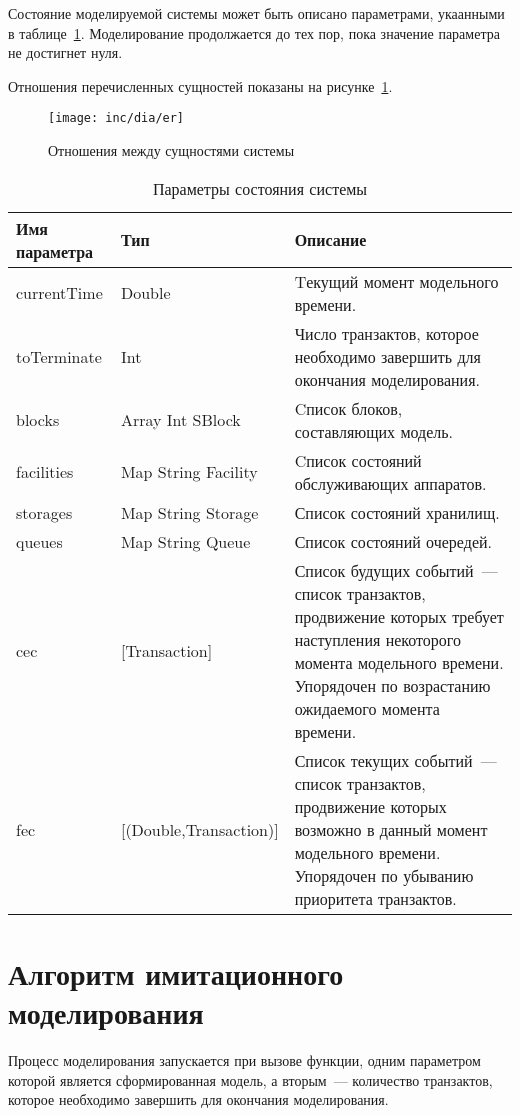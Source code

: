 Состояние моделируемой системы может быть описано параметрами, укаанными в таблице~\ref{tab:simState}. Моделирование продолжается до тех пор, пока значение параметра  не достигнет нуля.

Отношения перечисленных сущностей показаны на рисунке~\ref{fig:umlSim}.

\begin{figure}[ht]
  \centering
  \texttt{[image: inc/dia/er]}
  \caption{Отношения между сущностями системы}
  \label{fig:umlSim}
\end{figure}


\begin{table}[ht!]
\caption{Параметры состояния системы}
\label{tab:simState}
\begin{tabular}{|l|l|p{}|}
\hline
Имя параметра & Тип & Описание \\
\hline
currentTime & Double & Tекущий момент модельного времени.\\
\hline
toTerminate & Int & Число транзактов, которое необходимо завершить для окончания моделирования.\\
\hline
blocks & Array Int SBlock & Cписок блоков, составляющих модель.\\
\hline
facilities & Map String Facility & Cписок состояний обслуживающих аппаратов.\\
\hline
storages & Map String Storage & Список состояний хранилищ.\\
\hline
queues & Map String Queue & Список состояний очередей.\\
\hline
cec & [Transaction] & Список будущих событий~--- список транзактов, продвижение которых требует наступления некоторого момента модельного времени. Упорядочен по возрастанию ожидаемого момента времени. \\
\hline
fec & [(Double,Transaction)] & Список текущих событий~--- список транзактов, продвижение которых возможно в данный момент модельного времени. Упорядочен по убыванию приоритета транзактов. \\
\hline
\end{tabular}
\end{table}


\section{Алгоритм имитационного моделирования}

Процесс моделирования запускается при вызове функции, одним параметром которой является сформированная модель, а вторым~--- количество транзактов, которое необходимо завершить для окончания моделирования.

